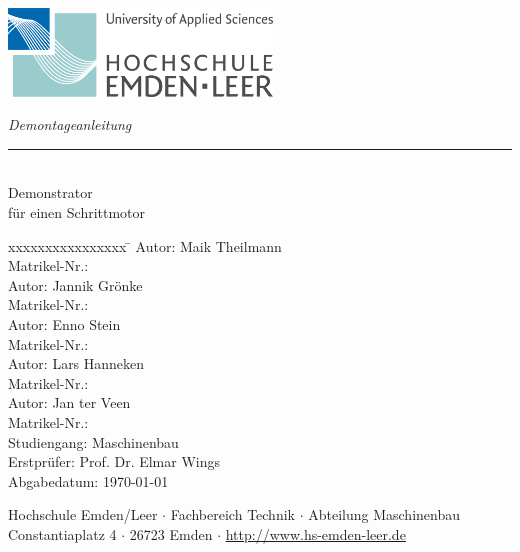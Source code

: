 %
%

\begin{titlepage}
    
    \begin{flushleft} 
        \includegraphics[width=7cm]{General/Logo_HS_Emden_Leer.jpg}
    \end{flushleft} 
    
    \begin{flushright}
        \vspace{2cm}
        \LARGE \textsl{Demontageanleitung}\\
        \rule{0.6\textwidth}{0.4pt} ~\\
        \vspace{0.5cm}
        \textsf{\LARGE Demonstrator}\\
        \textsf{\LARGE für einen Schrittmotor}
    \end{flushright}
    
    \vspace{3cm}
    \large
    \begin{tabbing}
       xxxxxxxxxxxxxxxx \= \kill
       Autor:			\> Maik Theilmann \\
       Matrikel-Nr.:	 \\
       Autor:			\> Jannik Grönke \\
       Matrikel-Nr.:	 \\
       Autor:			\> Enno Stein \\
       Matrikel-Nr.:	 \\
       Autor:			\> Lars Hanneken \\
       Matrikel-Nr.:	 \\
       Autor:			\> Jan ter Veen \\
       Matrikel-Nr.:	 \\
       Studiengang: \> Maschinenbau \\ [0.5cm]
       Erstprüfer: \> Prof. Dr. Elmar Wings \\
        Abgabedatum: \> \today \\
    \end{tabbing}
    
    \vspace{3cm}
    \small
    \begin{center}
        Hochschule Emden/Leer $\cdot$ 
        Fachbereich Technik $\cdot$ 
        Abteilung Maschinenbau \\
        Constantiaplatz 4 $\cdot$ 
        26723 Emden $\cdot$ 
        \url{http://www.hs-emden-leer.de}
    \end{center}
    
\end{titlepage}
